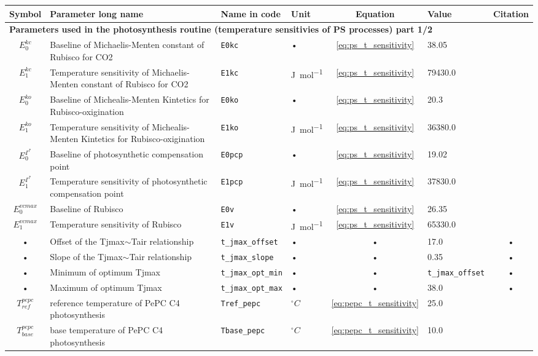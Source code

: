 \begin{table}
\begin{tabularx}{\linewidth}{|c|X|l|l|c|l|c|} %
\hline 
Symbol & Parameter long name & Name in code & Unit & Equation & Value & Citation \\ 
\hline 
\multicolumn{6}{l}{\bf Parameters used in the photosynthesis routine (temperature sensitivies of PS processes) part 1/2}\\
\hline
$E_0^{kc}$ & Baseline of Michaelis-Menten constant of Rubisco for CO2 & \texttt{E0kc} & • & \ref{eq:ps_t_sensitivity} & 38.05 & \cite{Bernacchi:2001wv} \\
$E_1^{kc}$ & Temperature sensitivity of Michaelis-Menten constant of Rubisco for CO2 & \texttt{E1kc} & \unit{J mol^{-1}} & \ref{eq:ps_t_sensitivity} & 79430.0& \cite{Bernacchi:2001wv} \\ 
$E_0^{ko}$ & Baseline of Michealis-Menten Kintetics for Rubisco-oxigination & \texttt{E0ko} & • & \ref{eq:ps_t_sensitivity} & 20.3 & \cite{Bernacchi:2001wv} \\  
$E_1^{ko}$ & Temperature sensitivity of Michealis-Menten Kintetics for Rubisco-oxigination & \texttt{E1ko} & \unit{J mol^{-1}} & \ref{eq:ps_t_sensitivity} & 36380.0 & \cite{Bernacchi:2001wv} \\  
$E_0^{\Gamma^{*}}$ & Baseline of photosynthetic compensation point & \texttt{E0pcp} & • & \ref{eq:ps_t_sensitivity} & 19.02 & \cite{Bernacchi:2001wv} \\  
$E_1^{\Gamma^{*}}$ & Temperature sensitivity of photosynthetic compensation point & \texttt{E1pcp} & \unit{J mol^{-1}} & \ref{eq:ps_t_sensitivity} & 37830.0 & \cite{Bernacchi:2001wv} \\  
$E_0^{vcmax}$ & Baseline of Rubisco & \texttt{E0v} & • & \ref{eq:ps_t_sensitivity} & 26.35 & \cite{Bernacchi:2001wv} \\  
$E_1^{vcmax}$ & Temperature sensitivity of Rubisco & \texttt{E1v} & \unit{J mol^{-1}} & \ref{eq:ps_t_sensitivity} & 65330.0 & \cite{Bernacchi:2001wv} \\  
• & Offset of the Tjmax$\sim$Tair relationship & \texttt{t\_jmax\_offset} & • & • & 17.0 & • \\
• & Slope of the Tjmax$\sim$Tair relationship & \texttt{t\_jmax\_slope} & • & • & 0.35 & • \\
• & Minimum of optimum Tjmax & \texttt{t\_jmax\_opt\_min} & • & • & \texttt{t\_jmax\_offset} & • \\
• & Maximum of optimum Tjmax & \texttt{t\_jmax\_opt\_max} & • & • & 38.0 & • \\
$T_{ref}^{pepc} $  & reference temperature of PePC C4 photosynthesis & \texttt{Tref\_pepc} & $^{\circ}C$ & \ref{eq:pepc_t_sensitivity} & 25.0 & \cite{Friend:2009tf} \\  
$T_{base}^{pepc} $ & base temperature of PePC C4 photosynthesis & \texttt{Tbase\_pepc} & $^{\circ}C$ & \ref{eq:pepc_t_sensitivity} & 10.0 & \cite{Friend:2009tf} \\  
\hline 
\end{tabularx}
\end{table}


